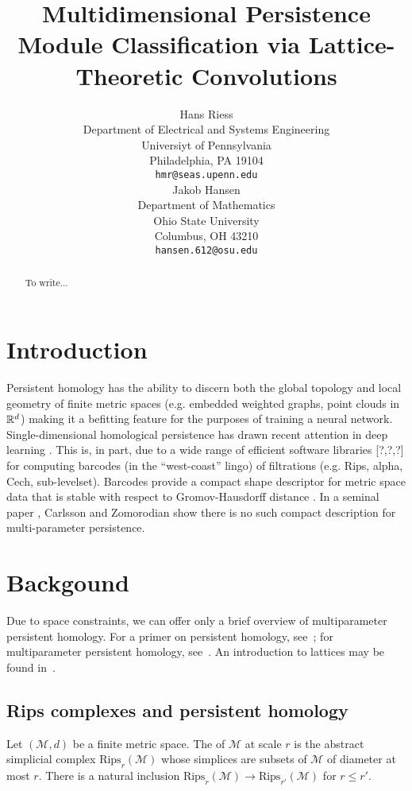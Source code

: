 \documentclass{article}
\title{Multidimensional Persistence Module Classification via Lattice-Theoretic Convolutions}
\author{%
  Hans Riess  \\
  Department of Electrical and Systems Engineering \\
  Universiyt of Pennsylvania\\
  Philadelphia, PA 19104 \\
  \texttt{hmr@seas.upenn.edu} \\
  \And
  Jakob Hansen \\
  Department of Mathematics \\
  Ohio State University \\
  Columbus, OH 43210 \\
  \texttt{hansen.612@osu.edu}
}
\begin{document}
\maketitle

\begin{abstract}
 To write...
\end{abstract}

\section{Introduction}

Persistent homology has the ability to discern both the global topology \cite{}
and local geometry \cite{} of finite metric spaces (e.g. embedded weighted
graphs, point clouds in $\mathbb{R}^d$) making it a befitting feature for the purposes of
training a neural network. Single-dimensional homological persistence has drawn
recent attention in deep learning \cite{}. This is, in part, due to a wide range
of efficient software libraries [?,?,?] for computing barcodes (in the
``west-coast'' lingo) of filtrations (e.g. Rips, alpha, {C}ech, sub-levelset).
Barcodes provide a compact shape descriptor for metric space data \cite{} that
is stable with respect to Gromov-Hausdorff distance \cite{}. In a seminal paper
\cite{}, Carlsson and Zomorodian show there is no such compact description for
multi-parameter persistence.

\section{Backgound}
Due to space constraints, we can offer only a brief overview of multiparameter
persistent homology. For a primer on persistent homology,
see~\cite{ghrist_barcodes_2008,carlsson_topology_2009}; for multiparameter
persistent homology, see~\cite{}. An introduction to lattices may be found in~\cite{}. 

\subsection{Rips complexes and persistent homology}
Let $(\mathcal M,d)$ be a finite metric space. The  of $\mathcal M$ at scale $r$ is the abstract simplicial complex
$\text{Rips}_r(\mathcal M)$ whose simplices are subsets of $\mathcal M$ of
diameter at most $r$. There is a natural inclusion $\text{Rips}_r(\mathcal M)
\to \text{Rips}_{r'}(\mathcal M)$ for $r \leq r'$.
\end{document}
